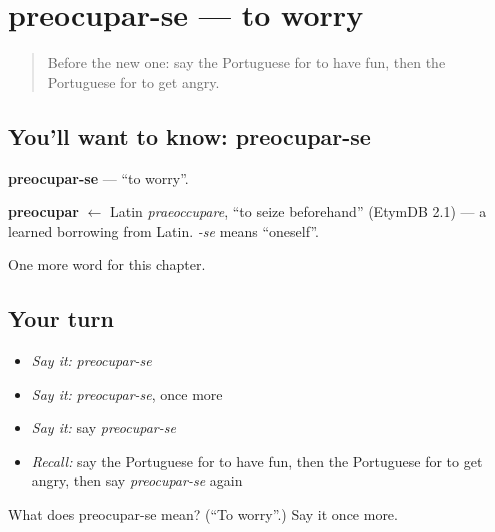 \section[preocupar-se]{preocupar-se — to worry}

\label{lesson:PT-C233-preocupar-se}



\begin{quote}
Before the new one: say the Portuguese for to have fun, then the Portuguese for to get angry.
\end{quote}

\subsection*{You'll want to know: preocupar-se}
\textbf{preocupar-se} — \textquotedblleft{}to worry\textquotedblright{}.

\begin{cousinweb}
\textbf{preocupar} $\leftarrow$ Latin \emph{praeoccupare}, \textquotedblleft{}to seize beforehand\textquotedblright{} (EtymDB 2.1) — a learned borrowing from Latin. \emph{-se} means \textquotedblleft{}oneself\textquotedblright{}.
\end{cousinweb}

\begin{grammarlens}[title={What you've built}]
One more word for this chapter.
\end{grammarlens}

\subsection*{Your turn}
\begin{itemize}
\raggedright
  \item \emph{Say it:} \emph{preocupar-se}
  \item \emph{Say it:} \emph{preocupar-se}, once more
  \item \emph{Say it:} say \emph{preocupar-se}
  \item \emph{Recall:} say the Portuguese for to have fun, then the Portuguese for to get angry, then say \emph{preocupar-se} again
\end{itemize}

\begin{tcolorbox}[breakable,colback=teal!4,colframe=teal!35!black,title={Before you move on}]
What does preocupar-se mean? (\textquotedblleft{}To worry\textquotedblright{}.) Say it once more.
\end{tcolorbox}
